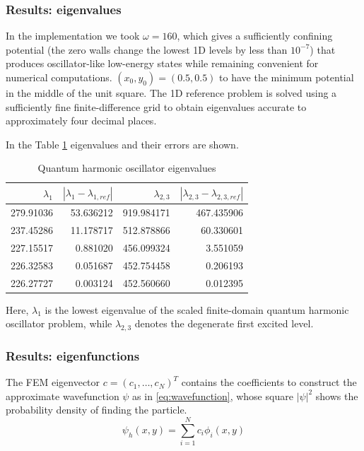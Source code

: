 \documentclass[acmsmall,screen]{MapleTrans}
\begin{document}
\subsubsection{Results: eigenvalues}
In the implementation we took $\omega = 160$, which gives a sufficiently confining potential (the zero walls change the lowest 1D levels by less than $10^{-7}$) that produces oscillator-like low-energy states while remaining convenient for numerical computations. $(x_0, y_0) = (0.5, 0.5)$ to have the minimum potential in the middle of the unit square. The 1D reference problem is solved using a sufficiently fine finite-difference grid to obtain eigenvalues accurate to approximately four decimal places.

In the Table \ref{tab:oscil results} eigenvalues and their errors are shown.
\begin{table}[H]
    \centering
    \caption{Quantum harmonic oscillator eigenvalues}
    \label{tab:oscil results}
    \begin{tabular}{rrrr}
        \toprule
        $\lambda_1$ & $|\lambda_1 - \lambda_{1, ref}|$ & $\lambda_{2,3}$ & $|\lambda_{2,3} - \lambda_{2,3,ref}|$ \\
        \midrule
        279.91036 & 53.636212 & 919.984171 & 467.435906 \\
        237.45286 & 11.178717 & 512.878866 & 60.330601 \\
        227.15517 & 0.881020 & 456.099324 & 3.551059 \\
        226.32583 & 0.051687 & 452.754458 & 0.206193 \\
        226.27727 & 0.003124 & 452.560660 & 0.012395 \\
        \bottomrule
    \end{tabular}
\end{table}

Here, $\lambda_1$ is the lowest eigenvalue of the scaled finite-domain quantum harmonic oscillator problem, while $\lambda_{2,3}$ denotes the degenerate first excited level.


\subsubsection{Results: eigenfunctions}
The FEM eigenvector $c = (c_1, \dots, c_N)^T$ contains the coefficients to construct the approximate wavefunction $\psi$ as in \eqref{eq:wavefunction}, whose square $|\psi|^2$ shows the probability density of finding the particle.
\begin{equation}
    \psi_h(x, y) = \sum_{i=1}^{N} c_i\phi_i(x, y)
    \label{eq:wavefunction}
\end{equation}
\end{document}
